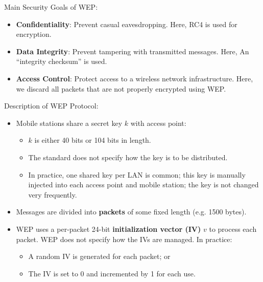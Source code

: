 \documentclass[12pt,titlepage]{article}
\begin{document}
Main Security Goals of WEP: \begin{itemize}
\item \textbf{Confidentiality}: Prevent casual eavesdropping. Here, RC4 is used for encryption.
\item \textbf{Data Integrity}: Prevent tampering with transmitted messages. Here, An ``integrity checksum'' is used.
\item \textbf{Access Control}: Protect access to a wireless network infrastructure. Here, we discard all packets that are not properly encrypted using WEP.
\end{itemize}

Description of WEP Protocol: \begin{itemize}
\item Mobile stations share a secret key $k$ with access point: \begin{itemize}
\item $k$ is either 40 bits or 104 bits in length.
\item The standard does not specify how the key is to be distributed.
\item In practice, one shared key per LAN is common; this key is manually injected into each access point and mobile station; the key is not changed very frequently.
\end{itemize}
\item Messages are divided into \textbf{packets} of some fixed length (e.g. 1500 bytes).
\item WEP uses a per-packet 24-bit \textbf{initialization vector (IV)} $v$ to process each packet. WEP does not specify how the IVs are managed. In practice: \begin{itemize}
\item A random IV is generated for each packet; or
\item The IV is set to 0 and incremented by 1 for each use.
\end{itemize}
\end{itemize}

\end{document}
